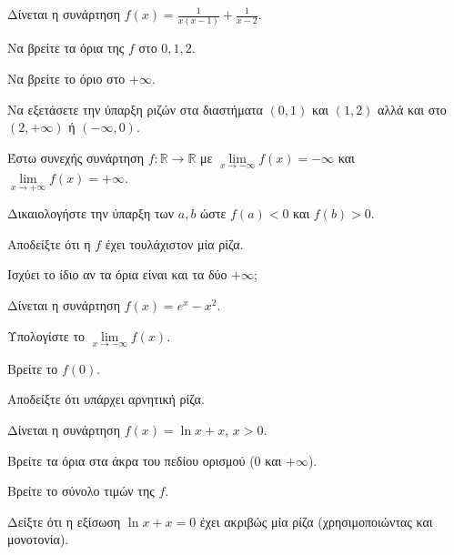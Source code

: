 \documentclass[11pt,a4paper,modern]{FFExercises}
\begin{document}
\askhsh
Δίνεται η συνάρτηση $f(x) = \frac{1}{x(x-1)} + \frac{1}{x-2}$.
\begin{alist}
    \item Να βρείτε τα όρια της $f$ στο $0, 1, 2$.
    \item Να βρείτε το όριο στο $+\infty$.
    \item Να εξετάσετε την ύπαρξη ριζών στα διαστήματα $(0,1)$ και $(1,2)$ αλλά και στο $(2, +\infty)$ ή $(-\infty, 0)$.
\end{alist}

\askhsh
Έστω συνεχής συνάρτηση $f: \mathbb{R} \to \mathbb{R}$ με $\lim\limits_{x\to -\infty}f(x) = -\infty$ και $\lim\limits_{x\to +\infty}f(x) = +\infty$.
\begin{alist}
    \item Δικαιολογήστε την ύπαρξη των $a, b$ ώστε $f(a)<0$ και $f(b)>0$.
    \item Αποδείξτε ότι η $f$ έχει τουλάχιστον μία ρίζα.
    \item Ισχύει το ίδιο αν τα όρια είναι και τα δύο $+\infty$;
\end{alist}

\askhsh
Δίνεται η συνάρτηση $f(x)=e^x - x^2$.
\begin{alist}
    \item Υπολογίστε το $\lim\limits_{x\to -\infty}f(x)$.
    \item Βρείτε το $f(0)$.
    \item Αποδείξτε ότι υπάρχει αρνητική ρίζα.
\end{alist}

\askhsh
Δίνεται η συνάρτηση $f(x) = \ln x + x$, $x>0$.
\begin{alist}
    \item Βρείτε τα όρια στα άκρα του πεδίου ορισμού ($0$ και $+\infty$).
    \item Βρείτε το σύνολο τιμών της $f$.
    \item Δείξτε ότι η εξίσωση $\ln x + x = 0$ έχει ακριβώς μία ρίζα (χρησιμοποιώντας και μονοτονία).
\end{alist}
\end{document}

